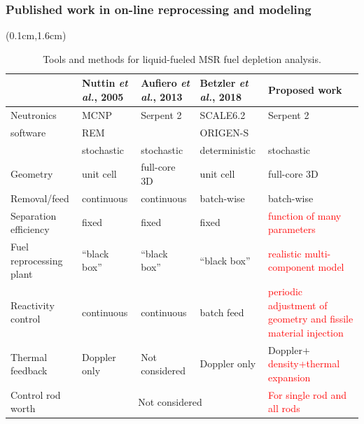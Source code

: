 \begin{frame}
\frametitle{Published work in on-line reprocessing and modeling}

  \begin{textblock*}{12.5cm}(0.1cm,1.6cm) %
	\begin{table}[t]
	\fontsize{7}{9}\selectfont
	\caption{Tools and methods for liquid-fueled \gls{MSR} fuel depletion analysis.}
	\begin{tabularx}{\textwidth}{p{2.5cm} X X X p{3cm}} 
		\hline 
		&Nuttin \emph{et al.}, 2005 \cite{nuttin_potential_2005}& Aufiero \emph{et al.}, 
		2013 \cite{aufiero_extended_2013} & Betzler \emph{et al.}, 2018 
		\cite{betzler_fuel_2018}&Proposed work \\ 
		\hline
		Neutronics & \gls{MCNP} & Serpent 2 & SCALE6.2 & Serpent 2 \\
		software   & REM &           & ORIGEN-S &  \\
	               & stochastic & stochastic & deterministic & stochastic\\ [3pt]
		Geometry  & unit cell & full-core 3D & unit cell & full-core 3D\\ [3pt]
		Removal/feed  & continuous &continuous & batch-wise & batch-wise\\ [3pt]
        Separation efficiency & fixed & fixed & fixed & \textcolor{red}{function of many parameters} \\[3pt]
        Fuel reprocessing plant & ``black box'' & ``black box'' & ``black box'' & \textcolor{red}{realistic multi-component model} \\[3pt]
        Reactivity control & continuous& continuous & batch feed & \textcolor{red}{periodic adjustment of geometry and fissile material injection}\\[3pt]
		Thermal feedback & Doppler only & Not considered & Doppler only & Doppler$+$\textcolor{red}{density+thermal expansion}\\[3pt]
		Control rod worth & \multicolumn{3}{c}{Not considered} & \textcolor{red}{For single rod and all rods} \\[3pt]
		\hline
	\end{tabularx}
	\label{tab:msr_codes}
\end{table}
\end{textblock*}

\end{frame}


